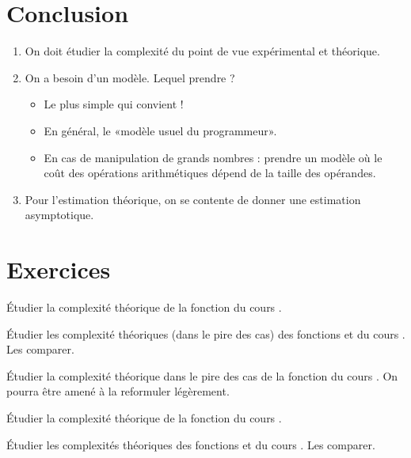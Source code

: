 \section{Conclusion}

\begin{enumerate}
\item On doit étudier la complexité du point de vue expérimental et théorique.
\item On a besoin d'un modèle. Lequel prendre ?
  \begin{itemize}
  \item Le plus simple qui convient !
  \item En général, le «modèle usuel du programmeur».
  \item En cas de manipulation de grands nombres : prendre un modèle où le coût
    des opérations arithmétiques dépend de la taille des opérandes.
  \end{itemize}
\item Pour l'estimation théorique, on se contente de donner une
  estimation asymptotique.
\end{enumerate}

\section{Exercices}

  \'Etudier la complexité théorique de la fonction  du cours .

  \'Etudier les complexité théoriques (dans le pire des cas) des fonctions  et  du cours . Les comparer.

  \'Etudier la complexité théorique dans le pire des cas de la fonction  du cours . On pourra être amené à la reformuler légèrement.

  \'Etudier la complexité théorique de la fonction  du cours .

  \'Etudier les complexités théoriques des fonctions  et  du cours . Les comparer.

%
%
%


% 
